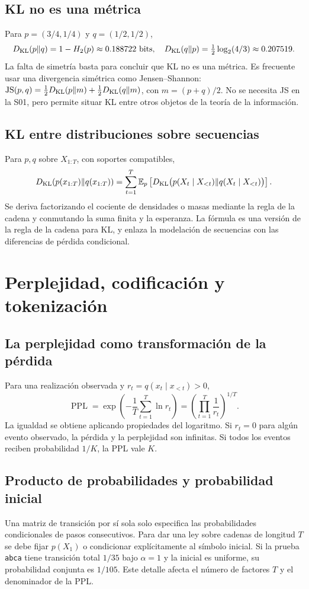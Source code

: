 \documentclass[11pt,a4paper]{report}
\begin{document}
\section{KL no es una métrica}
Para $p=(3/4,1/4)$ y $q=(1/2,1/2)$,
\[
D_{\rm KL}(p\|q)=1-H_2(p)\approx0.188722\text{ bits},
\quad D_{\rm KL}(q\|p)=\tfrac12\log_2(4/3)\approx0.207519.
\]
La falta de simetría basta para concluir que KL no es una métrica.
Es frecuente usar una divergencia simétrica como Jensen--Shannon:
$\mathrm{JS}(p,q)=\tfrac12D_{\rm KL}(p\|m)+\tfrac12D_{\rm KL}(q\|m)$,
con $m=(p+q)/2$. No se necesita JS en la S01, pero permite situar KL
entre otros objetos de la teoría de la información.
\section{KL entre distribuciones sobre secuencias}
Para $p,q$ sobre $X_{1:T}$, con soportes compatibles,
\[
D_{\rm KL}(p(x_{1:T})\|q(x_{1:T}))=
\sum_{t=1}^T\mathbb E_p\left[
D_{\rm KL}\bigl(p(X_t\mid X_{<t})\|q(X_t\mid X_{<t})\bigr)\right].
\]
Se deriva factorizando el cociente de densidades o masas mediante la regla
de la cadena y conmutando la suma finita y la esperanza. La fórmula es una
versión de la regla de la cadena para KL, y enlaza la modelación de
secuencias con las diferencias de pérdida condicional.

\chapter{Perplejidad, codificación y tokenización}
\section{La perplejidad como transformación de la pérdida}
Para una realización observada y $r_t=q(x_t\mid x_{<t})>0$,
\[
\operatorname{PPL}=\exp\left(-\frac1T\sum_{t=1}^T\ln r_t\right)
=\left(\prod_{t=1}^T\frac1{r_t}\right)^{1/T}.
\]
La igualdad se obtiene aplicando propiedades del logaritmo. Si $r_t=0$
para algún evento observado, la pérdida y la perplejidad son infinitas.
Si todos los eventos reciben probabilidad $1/K$, la PPL vale $K$.
\section{Producto de probabilidades y probabilidad inicial}
Una matriz de transición por sí sola solo especifica las probabilidades
condicionales de pasos consecutivos. Para dar una ley sobre cadenas de
longitud $T$ se debe fijar $p(X_1)$ o condicionar explícitamente al símbolo
inicial. Si la prueba \texttt{abca} tiene transición total $1/35$ bajo
$\alpha=1$ y la inicial es uniforme, su probabilidad conjunta es $1/105$.
Este detalle afecta el número de factores $T$ y el denominador de la PPL.
\end{document}
